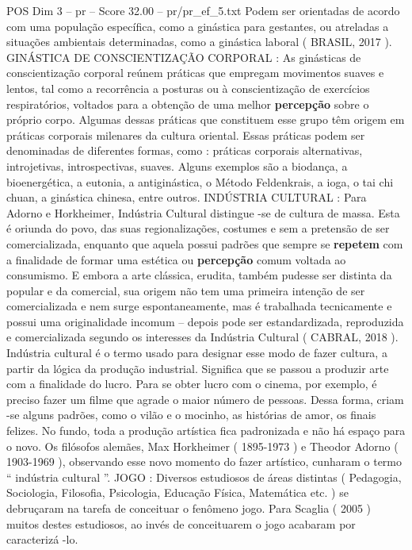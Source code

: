 \begin{textsample}{POS Dim 3 – pr – Score 32.00 – pr/pr\_ef\_5.txt}
Podem ser orientadas de acordo com uma população específica, como a ginástica para gestantes, ou atreladas a situações ambientais determinadas, como a ginástica laboral ( BRASIL, 2017 ).
GINÁSTICA DE CONSCIENTIZAÇÃO CORPORAL : As ginásticas de conscientização corporal reúnem práticas que empregam movimentos suaves e lentos, tal como a recorrência a posturas ou à conscientização de exercícios respiratórios, voltados para a obtenção de uma melhor \textbf{percepção} sobre o próprio corpo.
Algumas dessas práticas que constituem esse grupo têm origem em práticas corporais milenares da cultura oriental.
Essas práticas podem ser denominadas de diferentes formas, como : práticas corporais alternativas, introjetivas, introspectivas, suaves.
Alguns exemplos são a biodança, a bioenergética, a eutonia, a antiginástica, o Método Feldenkrais, a ioga, o tai chi chuan, a ginástica chinesa, entre outros.
INDÚSTRIA CULTURAL : Para Adorno e Horkheimer, Indústria Cultural distingue -se de cultura de massa.
Esta é oriunda do povo, das suas regionalizações, costumes e sem a pretensão de ser comercializada, enquanto que aquela possui padrões que sempre se \textbf{repetem} com a finalidade de formar uma estética ou \textbf{percepção} comum voltada ao consumismo.
E embora a arte clássica, erudita, também pudesse ser distinta da popular e da comercial, sua origem não tem uma primeira intenção de ser comercializada e nem surge espontaneamente, mas é trabalhada tecnicamente e possui uma originalidade incomum – depois pode ser estandardizada, reproduzida e comercializada segundo os interesses da Indústria Cultural ( CABRAL, 2018 ).
Indústria cultural é o termo usado para designar esse modo de fazer cultura, a partir da lógica da produção industrial.
Significa que se passou a produzir arte com a finalidade do lucro.
Para se obter lucro com o cinema, por exemplo, é preciso fazer um filme que agrade o maior número de pessoas.
Dessa forma, criam -se alguns padrões, como o vilão e o mocinho, as histórias de amor, os finais felizes.
No fundo, toda a produção artística fica padronizada e não há espaço para o novo.
Os filósofos alemães, Max Horkheimer ( 1895-1973 ) e Theodor Adorno ( 1903-1969 ), observando esse novo momento do fazer artístico, cunharam o termo “ indústria cultural ”.
JOGO : Diversos estudiosos de áreas distintas ( Pedagogia, Sociologia, Filosofia, Psicologia, Educação Física, Matemática etc. ) se debruçaram na tarefa de conceituar o fenômeno jogo.
Para Scaglia ( 2005 ) muitos destes estudiosos, ao invés de conceituarem o jogo acabaram por caracterizá -lo.

\end{textsample}
